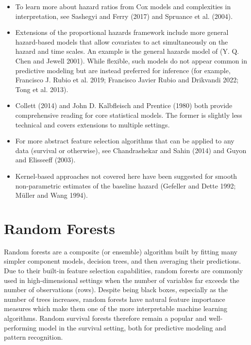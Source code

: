 \documentclass[
  letterpaper,
  krantz2]{style/krantz}
\providecommand{\tightlist}{%
  \setlength{\itemsep}{0pt}\setlength{\parskip}{0pt}}
\begin{document}
\begin{tcolorbox}[enhanced jigsaw, toprule=.15mm, bottomtitle=1mm, opacityback=0, breakable, leftrule=.75mm, title={Further reading}, toptitle=1mm, bottomrule=.15mm, colback=white, colframe=quarto-callout-tip-color-frame, titlerule=0mm, opacitybacktitle=0.6, coltitle=black, rightrule=.15mm, left=2mm, colbacktitle=quarto-callout-tip-color!10!white, arc=.35mm]

\begin{itemize}
\tightlist
\item
  To learn more about hazard ratios from Cox models and complexities in
  interpretation, see Sashegyi and Ferry (2017) and Spruance et al.
  (2004).
\item
  Extensions of the proportional hazards framework include more general
  hazard-based models that allow covariates to act simultaneously on the
  hazard and time scales. An example is the general hazards model of (Y.
  Q. Chen and Jewell 2001). While flexible, such models do not appear
  common in predictive modeling but are instead preferred for inference
  (for example, Francisco J. Rubio et al. 2019; Francisco Javier Rubio
  and Drikvandi 2022; Tong et al. 2013).
\item
  Collett (2014) and John D. Kalbfleisch and Prentice (1980) both
  provide comprehensive reading for core statistical models. The former
  is slightly less technical and covers extensions to multiple settings.
\item
  For more abstract feature selection algorithms that can be applied to
  any data (survival or otherwise), see Chandrashekar and Sahin (2014)
  and Guyon and Elisseeff (2003).
\item
  Kernel-based approaches not covered here have been suggested for
  smooth non-parametric estimates of the baseline hazard (Gefeller and
  Dette 1992; Müller and Wang 1994).
\end{itemize}

\end{tcolorbox}

\chapter{Random Forests}\label{sec-ranfor}

Random forests are a composite (or ensemble)
algorithm built by fitting many
simpler component models, decision trees, and then averaging their
predictions. Due to their built-in feature
selection capabilities, random forests are commonly used in
high-dimensional settings when the number of variables far exceeds the
number of observations
(rows). Despite
being black boxes, especially as the number of trees increases, random
forests have natural feature importance measures which make them one of
the more interpretable machine learning
algorithms.
Random survival forests therefore remain a popular and well-performing
model in the survival setting, both for predictive modeling and pattern
recognition.
\end{document}
